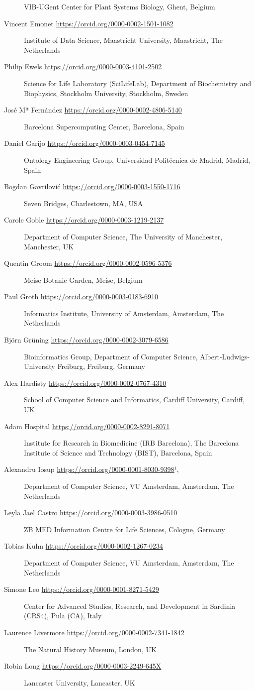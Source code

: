 \begin{description}
VIB-UGent Center for Plant Systems Biology, Ghent, Belgium
\item[Vincent Emonet \url{https://orcid.org/0000-0002-1501-1082}]
Institute of Data Science, Maastricht University, Maastricht, The
Netherlands
\item[Philip Ewels \url{https://orcid.org/0000-0003-4101-2502}]
Science for Life Laboratory (SciLifeLab), Department of Biochemistry and
Biophysics, Stockholm University, Stockholm, Sweden
\item[José Mª Fernández \url{https://orcid.org/0000-0002-4806-5140}]
Barcelona Supercomputing Center, Barcelona, Spain
\item[Daniel Garijo \url{https://orcid.org/0000-0003-0454-7145}]
Ontology Engineering Group, Universidad Politécnica de Madrid, Madrid,
Spain
\item[Bogdan Gavrilović \url{https://orcid.org/0000-0003-1550-1716}]
Seven Bridges, Charlestown, MA, USA
\item[Carole Goble \url{https://orcid.org/0000-0003-1219-2137}]
Department of Computer Science, The University of Manchester,
Manchester, UK
\item[Quentin Groom \url{https://orcid.org/0000-0002-0596-5376}]
Meise Botanic Garden, Meise, Belgium
\item[Paul Groth \url{https://orcid.org/0000-0003-0183-6910}]
Informatics Institute, University of Amsterdam, Amsterdam, The
Netherlands
\item[Björn Grüning \url{https://orcid.org/0000-0002-3079-6586}]
Bioinformatics Group, Department of Computer Science,
Albert-Ludwigs-University Freiburg, Freiburg, Germany
\item[Alex Hardisty \url{https://orcid.org/0000-0002-0767-4310}]
School of Computer Science and Informatics, Cardiff University, Cardiff,
UK
\item[Adam Hospital \url{https://orcid.org/0000-0002-8291-8071}]
Institute for Research in Biomedicine (IRB Barcelona), The Barcelona
Institute of Science and Technology (BIST), Barcelona, Spain
\item[Alexandru Iosup \url{https://orcid.org/0000-0001-8030-9398}¹,]
Department of Computer Science, VU Amsterdam, Amsterdam, The Netherlands
\item[Leyla Jael Castro \url{https://orcid.org/0000-0003-3986-0510}]
ZB MED Information Centre for Life Sciences, Cologne, Germany
\item[Tobias Kuhn \url{https://orcid.org/0000-0002-1267-0234}]
Department of Computer Science, VU Amsterdam, Amsterdam, The Netherlands
\item[Simone Leo \url{https://orcid.org/0000-0001-8271-5429}]
Center for Advanced Studies, Research, and Development in Sardinia
(CRS4), Pula (CA), Italy
\item[Laurence Livermore \url{https://orcid.org/0000-0002-7341-1842}]
The Natural History Museum, London, UK
\item[Robin Long \url{https://orcid.org/0000-0003-2249-645X}]
Lancaster University, Lancaster, UK


\end{description}
